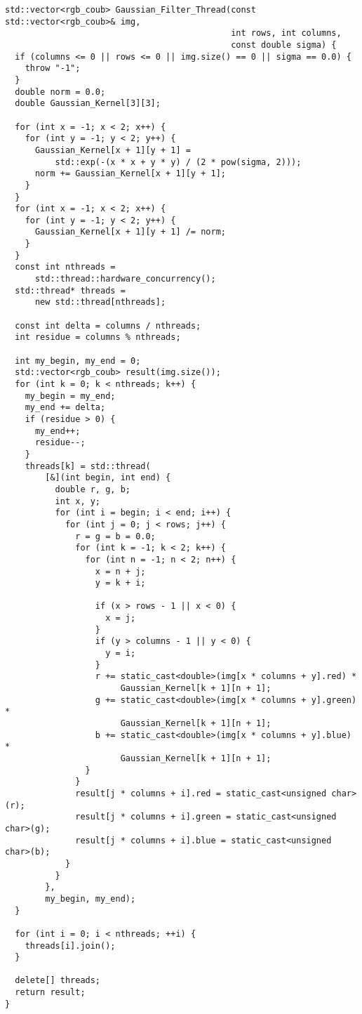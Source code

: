 \documentclass{report}
\begin{document}
\begin{lstlisting}
std::vector<rgb_coub> Gaussian_Filter_Thread(const std::vector<rgb_coub>& img,
                                             int rows, int columns,
                                             const double sigma) {
  if (columns <= 0 || rows <= 0 || img.size() == 0 || sigma == 0.0) {
    throw "-1";
  }
  double norm = 0.0;
  double Gaussian_Kernel[3][3];

  for (int x = -1; x < 2; x++) {
    for (int y = -1; y < 2; y++) {
      Gaussian_Kernel[x + 1][y + 1] =
          std::exp(-(x * x + y * y) / (2 * pow(sigma, 2)));
      norm += Gaussian_Kernel[x + 1][y + 1];
    }
  }
  for (int x = -1; x < 2; x++) {
    for (int y = -1; y < 2; y++) {
      Gaussian_Kernel[x + 1][y + 1] /= norm;
    }
  }
  const int nthreads =
      std::thread::hardware_concurrency();
  std::thread* threads =
      new std::thread[nthreads];

  const int delta = columns / nthreads;
  int residue = columns % nthreads;

  int my_begin, my_end = 0;
  std::vector<rgb_coub> result(img.size());
  for (int k = 0; k < nthreads; k++) {
    my_begin = my_end;
    my_end += delta;
    if (residue > 0) {
      my_end++;
      residue--;
    }
    threads[k] = std::thread(
        [&](int begin, int end) {
          double r, g, b;
          int x, y;
          for (int i = begin; i < end; i++) {
            for (int j = 0; j < rows; j++) {
              r = g = b = 0.0;
              for (int k = -1; k < 2; k++) {
                for (int n = -1; n < 2; n++) {
                  x = n + j;
                  y = k + i;

                  if (x > rows - 1 || x < 0) {
                    x = j;
                  }
                  if (y > columns - 1 || y < 0) {
                    y = i;
                  }
                  r += static_cast<double>(img[x * columns + y].red) *
                       Gaussian_Kernel[k + 1][n + 1];
                  g += static_cast<double>(img[x * columns + y].green) *
                       Gaussian_Kernel[k + 1][n + 1];
                  b += static_cast<double>(img[x * columns + y].blue) *
                       Gaussian_Kernel[k + 1][n + 1];
                }
              }
              result[j * columns + i].red = static_cast<unsigned char>(r);
              result[j * columns + i].green = static_cast<unsigned char>(g);
              result[j * columns + i].blue = static_cast<unsigned char>(b);
            }
          }
        },
        my_begin, my_end);
  }

  for (int i = 0; i < nthreads; ++i) {
    threads[i].join();
  }

  delete[] threads;
  return result;
}
\end{lstlisting}
\end{document}
